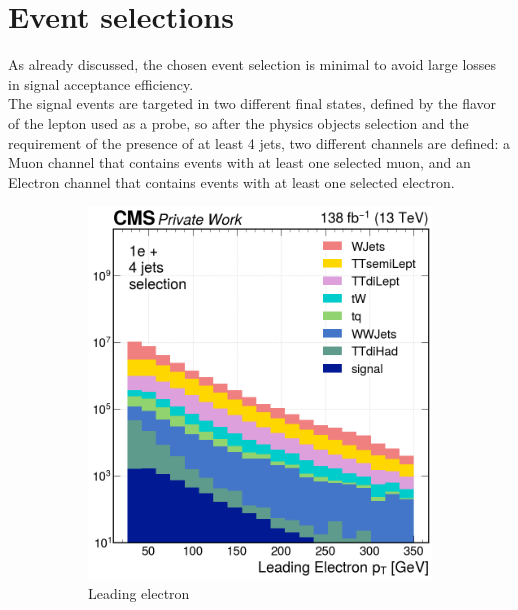  
\newpage
\section{Event selections}
As already discussed, the chosen event selection is minimal to avoid large losses in signal acceptance efficiency.\\ 
The signal events are targeted in two different final states, defined by the flavor of the lepton used as a probe, so after the physics objects selection and the requirement of the presence of at least 4 jets, two different channels are defined: a Muon channel that contains events with at least one selected muon, and an Electron channel that contains events with at least one selected electron.

\vspace{1.25cm}
\begin{figure}[H]
     \centering
     \begin{subfigure}{0.42\linewidth}
         \includegraphics[width=\linewidth]{fig//chap07-selection/selection/Leading_Electron_pt.png}
         \caption{Leading electron}
     \end{subfigure}
     \begin{subfigure}{0.42\linewidth}

\end{subfigure}
\end{figure}
